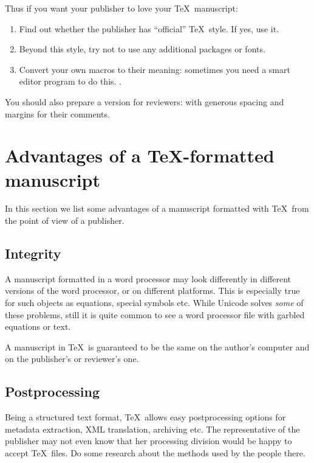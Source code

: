 \documentclass{article}
\begin{document}
Thus if you want your publisher to love your \TeX\ manuscript:
\begin{enumerate}
\item Find out whether the publisher has ``official'' \TeX\ style.  If
  yes, use it.
\item Beyond this style, try not to use any additional packages or fonts.
\item Convert your own macros to their meaning: sometimes you need a
  smart editor program to do this.  . 
\end{enumerate}

You should also prepare a version for reviewers: with generous spacing
and margins for their comments.

\section{Advantages of a \TeX-formatted manuscript}
\label{sec:advantages}

In this section we list some advantages of a manuscript formatted with
\TeX\ from the point of view of a publisher.

\subsection{Integrity}
\label{sec:integrity}

A manuscript formatted in a word processor may look differently in
different versions of the word processor, or on different platforms.
This is especially true for such objects as equations, special symbols
etc.  While Unicode solves \emph{some} of these problems, still it is
quite common to see a word processor file with garbled equations or
text.

A manuscript in \TeX\ is guaranteed to be the same on the author's
computer and on the publisher's or reviewer's one.

\subsection{Postprocessing}
\label{sec:postprocessing}

Being a structured text format, \TeX\ allows easy postprocessing
options for metadata extraction, XML translation, archiving etc.  The
representative of the publisher may not even know that her processing
division would be happy to accept \TeX\ files.  Do some research about
the methods used by the people there.  
\end{document}
